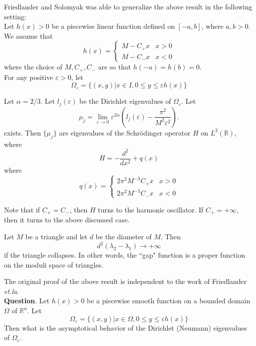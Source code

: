 Friedlander and Solomyak was able to generalize the above result in the 
following setting:
\\

Let $h(x) > 0$ be a piecewise linear function defined on $[-a, b]$, where
$a, b > 0$. We assume that
\[
h(x) = \left\{
\begin{array}{ll}
M-C_+x & x > 0 \\
M-C_-x & x < 0
\end{array}
\right.
\]
where the choice of $M, C_+, C_-$ are so that $h(-a) = h(b) = 0$.
\\

For any positive $\varepsilon > 0$, let
\[
\Omega_\varepsilon = \{(x,y)|x\in I, 0\leqslant y \leqslant \varepsilon h(x)\}
\]
\begin{theorem}
 Let $\alpha = 2/3$. Let $l_j(\varepsilon)$ be the
Dirichlet eigenvalues of $\Omega_\varepsilon$. Let
\[
\mu_j = \lim_{\varepsilon\rightarrow 0}
\varepsilon^{2\alpha}
\left(l_j(\varepsilon) - \frac{\pi^2}{M^2\varepsilon^2}\right).
\]
exists. Then $\{\mu_j\}$ are eigenvalues of the Schr\"{o}dinger operator $H$ on
$L^2(\mathbb{R})$, where
\[
H = -\frac{d^2}{dx^2} + q(x)
\]
where
\[
q(x) = \left\{
\begin{array}{ll}
2\pi^2 M^{-3} C_+x & x > 0 \\
2\pi^2 M^{-3} C_-x & x < 0
\end{array}
\right.
\]
\end{theorem}

Note that if $C_+ = C_-$, then $H$ turns to the harmonic oscillator. If
$C_+ = +\infty$, then it turns to the above discussed case.

\begin{theorem}
[Lu-Rowlett] Let $M$ be a triangle and let $d$ be the diameter of $M$. Then
\[
d^2(\lambda_2 - \lambda_1) \rightarrow +\infty
\]
if the triangle collapses. In other words, the ``gap" function is a proper
function on the moduli space of triangles.
\end{theorem}

The original proof of the above result is independent to the work of Friedlander
\textit{et.la.}
\\

\textbf{Question}. Let $h(x) > 0$ be a piecewise smooth function on a bounded
domain $\Omega$ of $\mathbb{R}^n$. Let
\[
\Omega_\varepsilon = \{(x,y)|x\in\Omega, 0\leqslant y\leqslant\varepsilon h(x)\}
\]
Then what is the asymptotical behavior of the Dirichlet (Neumann) eigenvalues of
$\Omega_\varepsilon$.
\\

